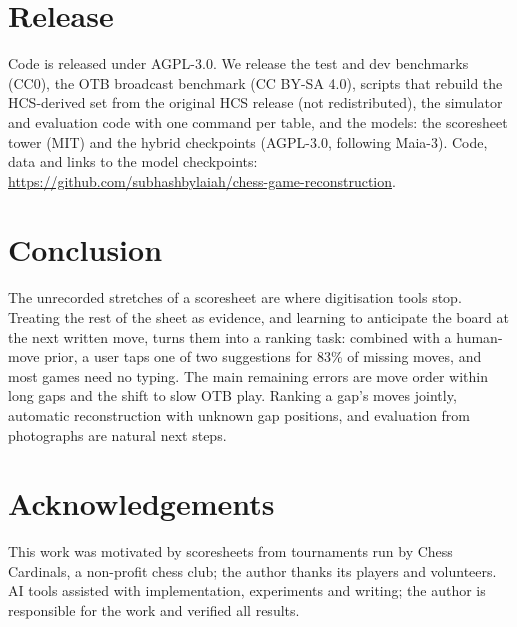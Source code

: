 \documentclass[11pt]{article}
\begin{document}
\section{Release}
Code is released under AGPL-3.0. We release the test and dev benchmarks (CC0), the OTB broadcast benchmark (CC BY-SA 4.0), scripts that rebuild the HCS-derived set from the original HCS release (not redistributed), the simulator and evaluation code with one command per table, and the models: the scoresheet tower (MIT) and the hybrid checkpoints (AGPL-3.0, following Maia-3). Code, data and links to the model checkpoints: \url{https://github.com/subhashbylaiah/chess-game-reconstruction}.

\section{Conclusion}
The unrecorded stretches of a scoresheet are where digitisation tools stop. Treating the rest of the sheet as evidence, and learning to anticipate the board at the next written move, turns them into a ranking task: combined with a human-move prior, a user taps one of two suggestions for 83\% of missing moves, and most games need no typing. The main remaining errors are move order within long gaps and the shift to slow OTB play. Ranking a gap's moves jointly, automatic reconstruction with unknown gap positions, and evaluation from photographs are natural next steps.

\section*{Acknowledgements}
This work was motivated by scoresheets from tournaments run by Chess Cardinals, a non-profit chess club; the author thanks its players and volunteers. AI tools assisted with implementation, experiments and writing; the author is responsible for the work and verified all results.




\appendix
\end{document}
